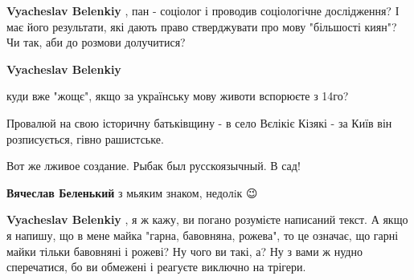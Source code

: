 \begin{itemize}
\begin{itemize}
\textbf{Vyacheslav Belenkiy} , пан - соціолог і проводив соціологічне дослідження? І має його результати, які дають право стверджувати про мову "більшості киян"? Чи так, аби до розмови долучитися?

 
\textbf{Vyacheslav Belenkiy} 

куди вже "жощє", якщо за українську мову животи вспорюєте з 14го?

Провалюй на свою історичну батьківщину - в село Вєлікіє Кізякі - за Київ він
розписується, гівно рашистське.

 
\obeycr
Вот же лживое создание.
Рыбак был русскоязычный.
В сад!
\restorecr


 
\textbf{Вячеслав Беленький} з мьяким знаком, недолiк 😉

 
\textbf{Vyacheslav Belenkiy} , я ж кажу, ви погано розумієте написаний текст. А
якщо я напишу, що в мене майка "гарна, бавовняна, рожева", то це означає, що
гарні майки тільки бавовняні і рожеві? Ну чого ви такі, а? Ну з вами ж нудно
сперечатися, бо ви обмежені і реагуєте виключно на трігери.

 

\end{itemize}
\end{itemize}
